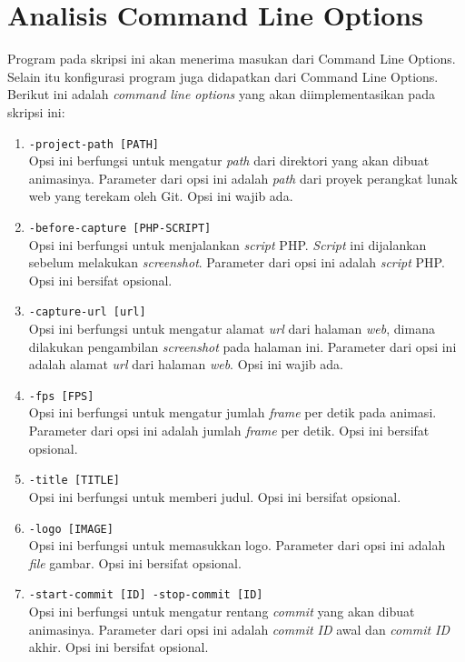 \section{Analisis Command Line Options}
\label{sec:analisis_command_line_options}
Program pada skripsi ini akan menerima masukan dari Command Line Options. Selain itu konfigurasi program juga didapatkan dari Command Line Options. Berikut ini adalah \textit{command line options} yang akan diimplementasikan pada skripsi ini:
\begin{enumerate}
\item \texttt{-project-path [PATH]}\\
Opsi ini berfungsi untuk mengatur \textit{path} dari direktori yang akan dibuat animasinya. Parameter dari opsi ini adalah \textit{path} dari proyek perangkat lunak web yang terekam oleh Git. Opsi ini wajib ada.

\item \texttt{-before-capture [PHP-SCRIPT]}\\
Opsi ini berfungsi untuk menjalankan \textit{script} PHP. \textit{Script} ini dijalankan sebelum melakukan \textit{screenshot}. Parameter dari opsi ini adalah \textit{script} PHP. Opsi ini bersifat opsional.

\item \texttt{-capture-url [url]}\\
Opsi ini berfungsi untuk mengatur alamat \textit{url} dari halaman \textit{web}, dimana dilakukan pengambilan \textit{screenshot} pada halaman ini. Parameter dari opsi ini adalah alamat \textit{url} dari halaman \textit{web}. Opsi ini wajib ada.

\item \texttt{-fps [FPS]}\\
Opsi ini berfungsi untuk mengatur jumlah \textit{frame} per detik pada animasi.  Parameter dari opsi ini adalah jumlah \textit{frame} per detik. Opsi ini bersifat opsional.

\item \texttt{-title [TITLE]}\\
Opsi ini berfungsi untuk memberi judul. Opsi ini bersifat opsional. 

\item \texttt{-logo [IMAGE]}\\
Opsi ini berfungsi untuk memasukkan logo. Parameter dari opsi ini adalah \textit{file} gambar. Opsi ini bersifat opsional.

\item \texttt{-start-commit [ID] -stop-commit [ID]}\\
Opsi ini berfungsi untuk mengatur rentang \textit{commit} yang akan dibuat animasinya. Parameter dari opsi ini adalah \textit{commit ID} awal dan \textit{commit ID} akhir. Opsi ini bersifat opsional. 
\end{enumerate}
